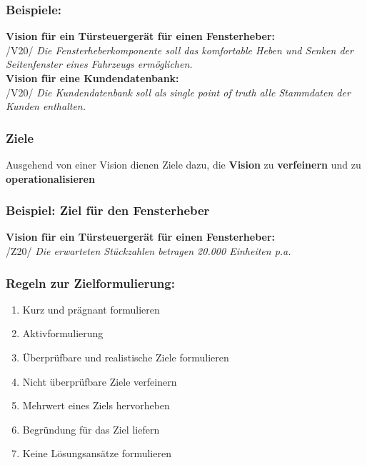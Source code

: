 \documentclass[11pt, a4paper]{article}
\begin{document}
\subsubsection*{Beispiele:}

\textbf{Vision für ein Türsteuergerät für einen Fensterheber:} \\
/V20/ \textit{Die Fensterheberkomponente soll das komfortable Heben und Senken der Seitenfenster eines Fahrzeugs ermöglichen.} 
\\ 
\textbf{Vision für eine Kundendatenbank:} \\
/V20/ \textit{Die Kundendatenbank soll als single point of truth alle Stammdaten der Kunden enthalten.}

\newpage

\subsubsection{Ziele}

Ausgehend von einer Vision dienen Ziele dazu, die \textbf{Vision} zu \textbf{verfeinern} und zu \textbf{operationalisieren}


\subsubsection*{Beispiel: Ziel für den Fensterheber}

\textbf{Vision für ein Türsteuergerät für einen Fensterheber:} \\
/Z20/ \textit{Die erwarteten Stückzahlen betragen 20.000 Einheiten p.a.} 

\subsubsection*{Regeln zur Zielformulierung:}

\begin{enumerate}
    \item Kurz und prägnant formulieren
    \item Aktivformulierung
    \item Überprüfbare und realistische Ziele formulieren
    \item Nicht überprüfbare Ziele verfeinern
    \item Mehrwert eines Ziels hervorheben
    \item Begründung für das Ziel liefern
    \item Keine Lösungsansätze formulieren
\end{enumerate}
\end{document}
